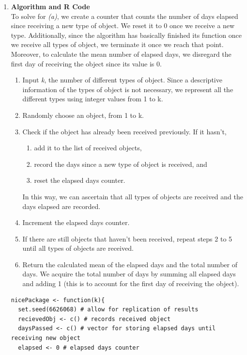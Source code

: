 \documentclass[12pt,letterpaper]{article}
\newcommand{\code}[1]{\colorbox{light-gray}{\texttt{#1}}}
\begin{document}
    \begin{enumerate}[label=\Alph*]
        \item \textbf{Algorithm and R Code}\\
        To solve for \textit{(a)}, we create a counter that counts the number of days elapsed since receiving a new type of object. We reset it to 0 once we receive a new type. Additionally, since the algorithm has basically finished its function once we receive all types of object, we terminate it once we reach that point. Moreover, to calculate the mean number of elapsed days, we disregard the first day of receiving the object since its value is 0. 
        \begin{enumerate}[label=\arabic*.]
            \item Input \textit{k}, the number of different types of object. Since a descriptive information of the types of object is not necessary, we represent all the different types using integer values from 1 to k.
            \item Randomly choose an object, from 1 to k.
            \item Check if the object has already been received previously. If it hasn't, 
            \begin{enumerate}[label=3.\arabic*]
                \item add it to the list of received objects, 
                \item record the days since a new type of object is received, and
                \item reset the elapsed days counter. 
            \end{enumerate}
                In this way, we can ascertain that all types of objects are received and the days elapsed are recorded. 
            \item Increment the elapsed days counter.
            \item If there are still objects that haven't been received, repeat steps 2 to 5 until all types of objects are received. 
            \item Return the calculated mean of the elapsed days and the total number of days. We acquire the total number of days by summing all elapsed days and adding 1 (this is to account for the first day of receiving the object).
        \end{enumerate}
        \newpage
        \begin{lstlisting}[title=\footnotesize Code 5.1: \code{nicePackage} function]
nicePackage <- function(k){
  set.seed(6626068) # allow for replication of results
  recievedObj <- c() # records received object
  daysPassed <- c() # vector for storing elapsed days until receiving new object
  elapsed <- 0 # elapsed days counter
  

\end{lstlisting}
\end{enumerate}
\end{document}
